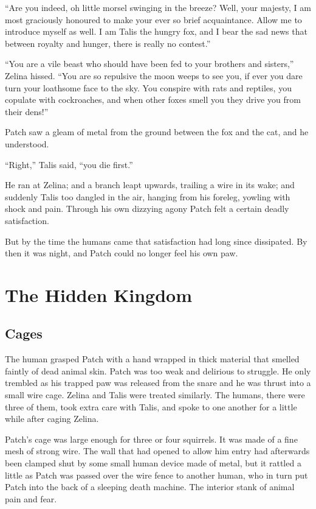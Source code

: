 \documentclass[ebook,oneside,openany,12pt]{memoir}
\begin{document}
“Are you indeed, oh little morsel swinging in the breeze? Well, your
majesty, I am most graciously honoured to make your ever so brief
acquaintance. Allow me to introduce myself as well. I am Talis the
hungry fox, and I bear the sad news that between royalty and hunger,
there is really no contest.”

“You are a vile beast who should have been fed to your brothers and
sisters,” Zelina hissed. “You are so repulsive the moon weeps to see
you, if ever you dare turn your loathsome face to the sky. You
conspire with rats and reptiles, you copulate with cockroaches, and
when other foxes smell you they drive you from their dens!”

Patch saw a gleam of metal from the ground between the fox and the
cat, and he understood.

“Right,” Talis said, “you die first.”

He ran at Zelina; and a branch leapt upwards, trailing a wire in its
wake; and suddenly Talis too dangled in the air, hanging from his
foreleg, yowling with shock and pain. Through his own dizzying agony
Patch felt a certain deadly satisfaction.

But by the time the humans came that satisfaction had long since
dissipated. By then it was night, and Patch could no longer feel his
own paw.


\chapter{The Hidden Kingdom}

\section{Cages}

The human grasped Patch with a hand wrapped in thick material that
smelled faintly of dead animal skin. Patch was too weak and delirious
to struggle. He only trembled as his trapped paw was released from the
snare and he was thrust into a small wire cage. Zelina and Talis were
treated similarly. The humans, there were three of them, took extra
care with Talis, and spoke to one another for a little while after
caging Zelina.

Patch’s cage was large enough for three or four squirrels. It was made
of a fine mesh of strong wire. The wall that had opened to allow him
entry had afterwards been clamped shut by some small human device made
of metal, but it rattled a little as Patch was passed over the wire
fence to another human, who in turn put Patch into the back of a
sleeping death machine. The interior stank of animal pain and fear.
\end{document}
